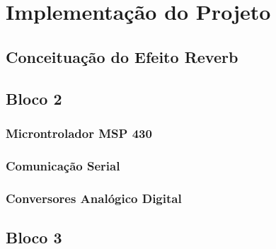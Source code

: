 \chapter{Implementação do Projeto}

\section{Conceituação do Efeito Reverb}

\section{Bloco 2}
	\subsection{Microntrolador MSP 430}
	\subsection{Comunicação Serial}
	\subsection{Conversores Analógico Digital}
\section{Bloco 3}